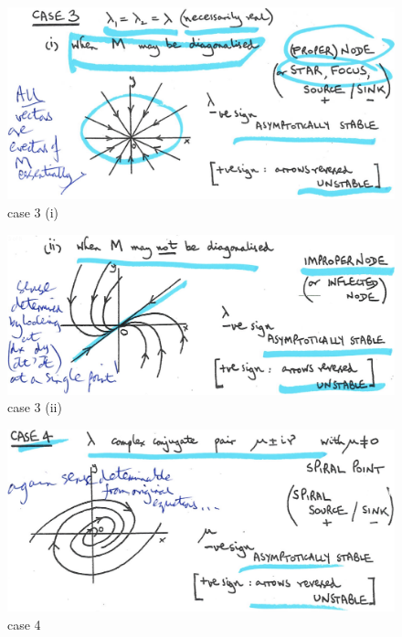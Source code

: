 \documentclass[12pt]{report}
\theoremstyle{definition}
\begin{document}
\begin{figure}
  	\includegraphics[scale=0.15]{PP3i.jpeg}
  	\centering
    \caption{case 3 (i)}\label{PP3i}
\end{figure}

\begin{figure}
  	\includegraphics[scale=0.15]{PP3ii.jpeg}
  	\centering
    \caption{case 3 (ii)}\label{PP3ii}
\end{figure}

\begin{figure}
  	\includegraphics[scale=0.15]{PP4.jpeg}
  	\centering
  	\caption{case 4}\label{PP4}
\end{figure}
\end{document}
